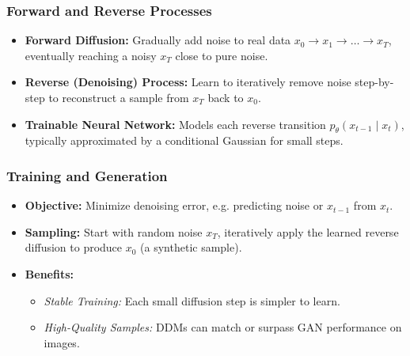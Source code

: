 \documentclass[twocolumn]{article}
\begin{document}
\begin{spacing}{1}
\subsubsection{Forward and Reverse Processes}
\begin{itemize}
    \item \textbf{Forward Diffusion:} Gradually add noise to real data $x_0 \to x_1 \to \dots \to x_T$, eventually reaching a noisy $x_T$ close to pure noise.
    \item \textbf{Reverse (Denoising) Process:} Learn to iteratively remove noise step-by-step to reconstruct a sample from $x_T$ back to $x_0$.
    \item \textbf{Trainable Neural Network:} Models each reverse transition $p_\theta(x_{t-1} \mid x_t)$, typically approximated by a conditional Gaussian for small steps.
\end{itemize}

\subsubsection{Training and Generation}
\begin{itemize}
    \item \textbf{Objective:} Minimize denoising error, e.g. predicting noise or $x_{t-1}$ from $x_t$.
    \item \textbf{Sampling:} Start with random noise $x_T$, iteratively apply the learned reverse diffusion to produce $x_0$ (a synthetic sample).
    \item \textbf{Benefits:}
    \begin{itemize}
        \item \emph{Stable Training:} Each small diffusion step is simpler to learn.
        \item \emph{High-Quality Samples:} DDMs can match or surpass GAN performance on images.
    \end{itemize}
\end{itemize}


\end{spacing}
\end{document}
